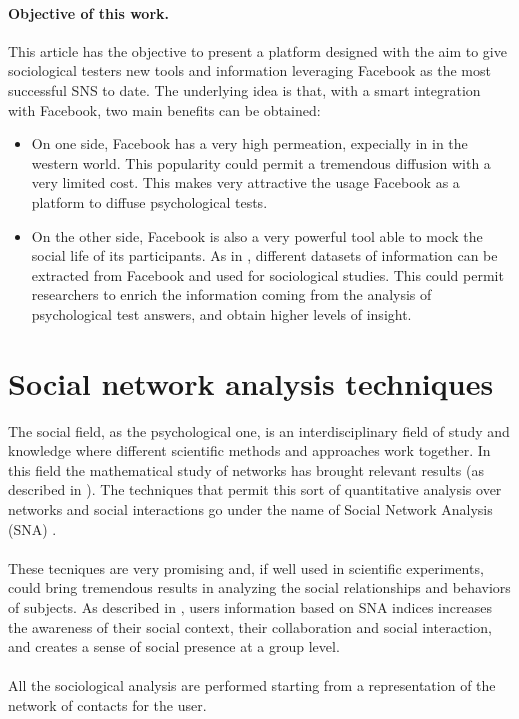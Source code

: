 \paragraph{Objective of this work.}
This article has the objective to present a platform designed with the aim to give sociological testers new tools and
information leveraging Facebook as the most successful SNS to date.
The underlying idea is that, with a smart integration with Facebook, two main beneﬁts can be obtained:

\begin{itemize}
\item On one side, Facebook has a very high permeation, expecially in in the western world.
This popularity could permit a tremendous diffusion with a very limited cost.
This makes very attractive the usage Facebook as a platform to diffuse psychological tests.
\item On the other side, Facebook is also a very powerful tool able to mock the social life of its participants.
As in \cite{Lewis-2008}, different datasets of information can be extracted from Facebook and used for sociological studies.
This could permit researchers to enrich the information coming from the analysis of psychological test answers, and obtain higher levels of insight.
\end{itemize}

\section{Social network analysis techniques}
The social ﬁeld, as the psychological one, is an interdisciplinary ﬁeld of study and knowledge where different scientiﬁc methods and approaches work together.
In this ﬁeld the mathematical study of networks has brought relevant results (as described in \cite{Wassermann-1994}).
The techniques that permit this sort of quantitative analysis over networks and social interactions go under the name of Social Network Analysis (SNA) \cite{Butts-2005}.\\
\\
These tecniques are very promising and, if well used in scientiﬁc experiments, could bring tremendous results in analyzing the social relationships and behaviors
of subjects.
As described in \cite{Martino-2007}, users information based on SNA indices increases the awareness of their social context, their collaboration and social interaction,
and creates a sense of social presence at a group level.\\
\\
All the sociological analysis are performed starting from a representation of the network of contacts for the user.


